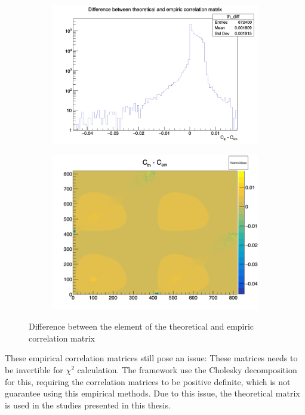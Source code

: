 \documentclass[../main.tex]{subfiles}
\begin{document}
\begin{figure}[ht]
  \centering
  \begin{subfigure}[t]{0.49\linewidth}
    \includegraphics[width=\linewidth]{images/joint_fit/th_em_corr_diff.png}
    \caption{}
    \label{fig:joint_fit:th_em_diff}
  \end{subfigure}
  \begin{subfigure}[t]{0.49\linewidth}
    \includegraphics[width=\linewidth]{images/joint_fit/th_em_corr_diff_mat.png}
    \caption{}
    \label{fig:joint_fit:th_em_diff_mat}
  \end{subfigure}
  \caption{Difference between the element of the theoretical and empiric correlation matrix}
\end{figure}

These empirical correlation matrices still pose an issue: These matrices needs to be invertible for $\chi^2$ calculation. The framework use the Cholesky decomposition \cite{noauthor_note_1924} for this, requiring the correlation matrices to be positive definite, which is not guarantee using this empirical methods. Due to this issue, the theoretical matrix is used in the studies presented in this thesis.
\end{document}
